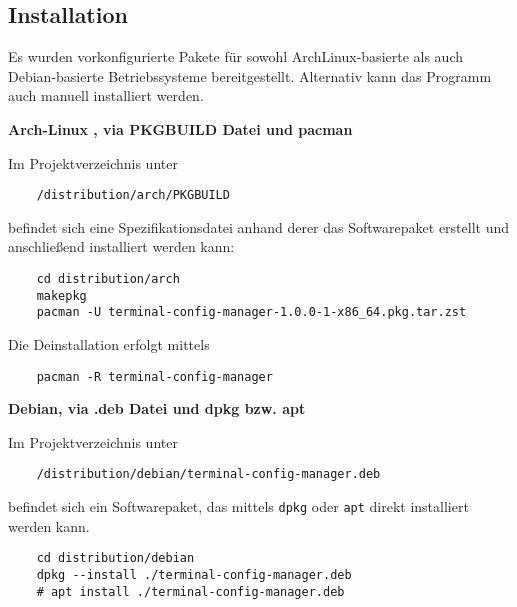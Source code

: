 \subsection{Installation} \label{Installation}
Es wurden vorkonfigurierte Pakete für sowohl ArchLinux\cite{arch}-basierte als auch
Debian\cite{debian}-basierte Betriebssysteme bereitgestellt. Alternativ
kann das Programm auch manuell installiert werden.

\begin{center}
	\textbf{Arch-Linux \cite{arch}, via PKGBUILD Datei und pacman \cite{pacman}}
\end{center}

Im Projektverzeichnis unter

\begin{verbatim}
	/distribution/arch/PKGBUILD
\end{verbatim}

befindet sich eine Spezifikationsdatei anhand derer das Softwarepaket
erstellt und anschließend installiert werden kann:

\begin{verbatim}
	cd distribution/arch
	makepkg
	pacman -U terminal-config-manager-1.0.0-1-x86_64.pkg.tar.zst
\end{verbatim}

Die Deinstallation erfolgt mittels

\begin{verbatim}
	pacman -R terminal-config-manager
\end{verbatim}

\begin{center}
	\textbf{Debian, via .deb Datei und dpkg\cite{dpkg}  bzw. apt\cite{apt}}
\end{center}

Im Projektverzeichnis unter

\begin{verbatim}
	/distribution/debian/terminal-config-manager.deb
\end{verbatim}

befindet sich ein Softwarepaket, das mittels \texttt{dpkg}
oder \texttt{apt} direkt installiert werden kann.

\begin{verbatim}
	cd distribution/debian
	dpkg --install ./terminal-config-manager.deb
	# apt install ./terminal-config-manager.deb
\end{verbatim}

